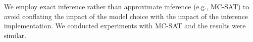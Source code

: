 \documentclass{article}
\begin{document}


%
%
%
%
%



We employ exact inference rather than approximate inference (e.g., MC-SAT) to avoid conflating the impact of the model choice with the impact of the inference implementation. We conducted experiments with MC-SAT and the results were similar. 
\end{document}
